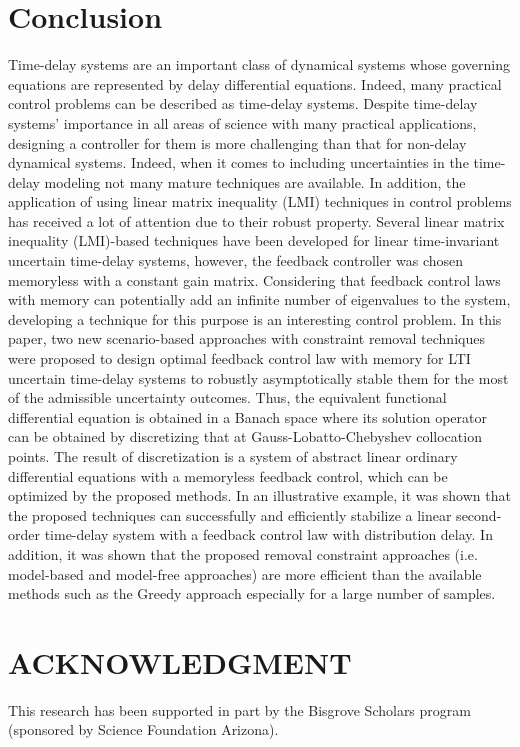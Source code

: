 \documentclass[journal]{IEEEtran}
\begin{document}
\section{Conclusion} \label{sect:con}
Time-delay systems are an important class of dynamical systems whose governing equations are represented by delay differential equations. Indeed, many practical control problems can be described as time-delay systems.
Despite time-delay systems' importance in all areas of science with many practical applications, designing a controller for them is more challenging than that for non-delay dynamical systems.
Indeed, when it comes to including uncertainties in the time-delay modeling not many mature techniques are available. In addition, the application of using linear matrix inequality (LMI) techniques in control problems has received a lot of attention due to their robust property.
Several linear matrix inequality (LMI)-based techniques have been developed for linear time-invariant uncertain time-delay systems, however, the feedback controller was chosen memoryless with a constant gain matrix. Considering that feedback control laws with memory can potentially add an infinite number of eigenvalues to the system, developing a technique for this purpose is an interesting control problem. In this paper, two new scenario-based approaches with constraint removal techniques were proposed to design optimal feedback control law with memory for LTI uncertain time-delay systems to robustly asymptotically stable them for the most of the admissible uncertainty outcomes.
Thus, the equivalent functional differential equation is obtained in a Banach space where its solution operator can be obtained by discretizing that at Gauss-Lobatto-Chebyshev collocation points. The result of discretization is a system of abstract linear ordinary differential equations with a memoryless feedback control, which can be optimized by the proposed methods.
In an illustrative example, it was shown that the proposed techniques can successfully and efficiently stabilize a linear second-order time-delay system with a feedback control law with distribution delay.
In addition, it was shown that the proposed removal constraint approaches (i.e. model-based and model-free approaches) are more efficient than the available methods such as the Greedy approach especially for a large number of samples.



\section*{ACKNOWLEDGMENT}
This research has been supported in part by the Bisgrove Scholars program (sponsored by Science Foundation Arizona).
\end{document}
